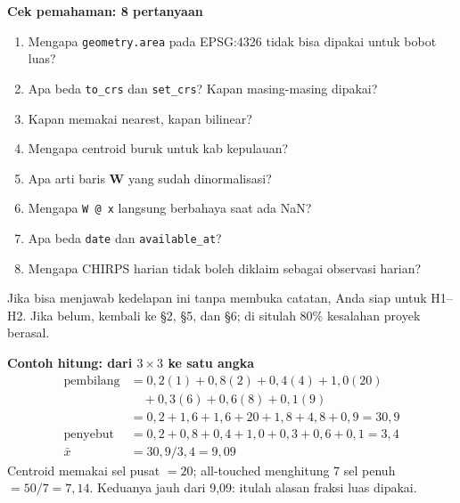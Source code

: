 \documentclass[9pt,a4paper]{extarticle}
\newcommand{\code}[1]{\texttt{\small\color{ink}#1}}
\begin{document}
\begin{tcolorbox}[enhanced,colback=bg,colframe=bg,boxrule=0pt,arc=1mm,left=3mm,right=3mm,top=2mm,bottom=2mm]
{\sffamily\bfseries\color{ink}Cek pemahaman: 8 pertanyaan}
\begin{enumerate}[leftmargin=1.2em,itemsep=0.15pt,topsep=1pt,font=\footnotesize]
  \item Mengapa \code{geometry.area} pada EPSG:4326 tidak bisa dipakai untuk bobot luas?
  \item Apa beda \code{to\_crs} dan \code{set\_crs}? Kapan masing-masing dipakai?
  \item Kapan memakai nearest, kapan bilinear?
  \item Mengapa centroid buruk untuk kab kepulauan?
  \item Apa arti baris $\mathbf{W}$ yang sudah dinormalisasi?
  \item Mengapa \code{W @ x} langsung berbahaya saat ada NaN?
  \item Apa beda \code{date} dan \code{available\_at}?
  \item Mengapa CHIRPS harian tidak boleh diklaim sebagai observasi harian?
\end{enumerate}
{\footnotesize\color{muted}Jika bisa menjawab kedelapan ini tanpa membuka catatan, Anda siap untuk H1--H2. Jika belum, kembali ke \S2, \S5, dan \S6; di situlah 80\% kesalahan proyek berasal.}
\end{tcolorbox}

\begin{tcolorbox}[enhanced,colback=tealbg,colframe=tealbg,boxrule=0pt,arc=1mm,left=3mm,right=3mm,top=2mm,bottom=2mm]
{\sffamily\bfseries\color{deepgreen}Contoh hitung: dari $3\times3$ ke satu angka}
\begin{align*}
\text{pembilang} &= 0{,}2(1)+0{,}8(2)+0{,}4(4)+1{,}0(20)\\
&\quad +0{,}3(6)+0{,}6(8)+0{,}1(9)\\
&= 0{,}2+1{,}6+1{,}6+20+1{,}8+4{,}8+0{,}9 = 30{,}9\\
\text{penyebut} &= 0{,}2+0{,}8+0{,}4+1{,}0+0{,}3+0{,}6+0{,}1 = 3{,}4\\
\bar{x} &= 30{,}9/3{,}4 = 9{,}09
\end{align*}
{\footnotesize Centroid memakai sel pusat $=20$; all-touched menghitung 7 sel penuh $=50/7=7{,}14$. Keduanya jauh dari 9,09: itulah alasan fraksi luas dipakai.}
\end{tcolorbox}
\end{document}
